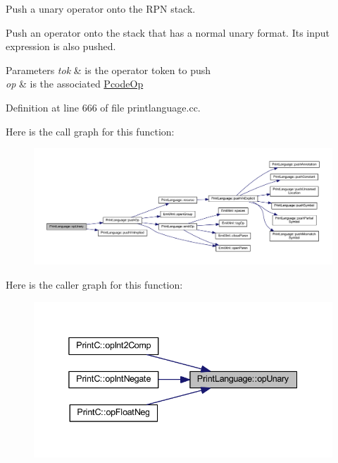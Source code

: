 Push a unary operator onto the R\+PN stack. 

Push an operator onto the stack that has a normal unary format. Its input expression is also pushed. 
\begin{DoxyParams}{Parameters}
{\em tok} & is the operator token to push \\
\hline
{\em op} & is the associated \mbox{\hyperlink{class_pcode_op}{Pcode\+Op}} \\
\hline
\end{DoxyParams}


Definition at line 666 of file printlanguage.\+cc.

Here is the call graph for this function\+:
\nopagebreak
\begin{figure}[H]
\begin{center}
\leavevmode
\includegraphics[width=350pt]{class_print_language_aff68af4415bc2cc51d86240c9427bd87_cgraph}
\end{center}
\end{figure}
Here is the caller graph for this function\+:
\nopagebreak
\begin{figure}[H]
\begin{center}
\leavevmode
\includegraphics[width=338pt]{class_print_language_aff68af4415bc2cc51d86240c9427bd87_icgraph}
\end{center}
\end{figure}
\mbox{\label{class_print_language_a4632e44b574dba8a818163edae913cd8}} 
